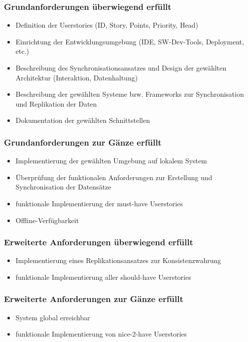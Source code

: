 \subsubsection{Grundanforderungen \textbf{überwiegend erfüllt}}

\begin{itemize}
    \item Definition der Userstories (ID, Story, Points, Priority, Head)
    \item Einrichtung der Entwicklungsumgebung (IDE, SW-Dev-Tools, Deployment, etc.)
    \item Beschreibung des Synchronisationsansatzes und Design der gewählten Architektur (Interaktion, Datenhaltung)
    \item Beschreibung der gewählten Systeme bzw. Frameworks zur Synchronisation und Replikation der Daten
    \item Dokumentation der gewählten Schnittstellen
\end{itemize}\cite{syt-exercises:mobile-application}

\subsubsection{Grundanforderungen \textbf{zur Gänze erfüllt}}

\begin{itemize}
    \item Implementierung der gewählten Umgebung auf lokalem System
    \item Überprüfung der funktionalen Anforderungen zur Erstellung und Synchronisation der Datensätze
    \item funktionale Implementierung der must-have Userstories
    \item Offline-Verfügbarkeit
\end{itemize}\cite{syt-exercises:mobile-application}

\subsubsection{Erweiterte Anforderungen \textbf{überwiegend erfüllt}}

\begin{itemize}
    \item Implementierung eines Replikationsansatzes zur Konsistenzwahrung
    \item funktionale Implementierung aller should-have Userstories
\end{itemize}\cite{syt-exercises:mobile-application}

\subsubsection{Erweiterte Anforderungen \textbf{zur Gänze erfüllt}}

\begin{itemize}
    \item System global erreichbar
    \item funktionale Implementierung von nice-2-have Userstories
\end{itemize}\cite{syt-exercises:mobile-application}

